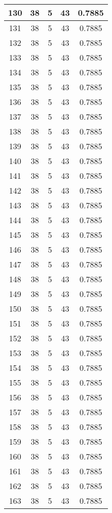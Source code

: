 \documentclass[letterpaper, 12pt]{article}
\begin{document}
\begin{longtable}{|c|c|c|c|c|}
\hline
130 & 38 & 5 & 43 & 0.7885 \\
\hline
131 & 38 & 5 & 43 & 0.7885 \\
\hline
132 & 38 & 5 & 43 & 0.7885 \\
\hline
133 & 38 & 5 & 43 & 0.7885 \\
\hline
134 & 38 & 5 & 43 & 0.7885 \\
\hline
135 & 38 & 5 & 43 & 0.7885 \\
\hline
136 & 38 & 5 & 43 & 0.7885 \\
\hline
137 & 38 & 5 & 43 & 0.7885 \\
\hline
138 & 38 & 5 & 43 & 0.7885 \\
\hline
139 & 38 & 5 & 43 & 0.7885 \\
\hline
140 & 38 & 5 & 43 & 0.7885 \\
\hline
141 & 38 & 5 & 43 & 0.7885 \\
\hline
142 & 38 & 5 & 43 & 0.7885 \\
\hline
143 & 38 & 5 & 43 & 0.7885 \\
\hline
144 & 38 & 5 & 43 & 0.7885 \\
\hline
145 & 38 & 5 & 43 & 0.7885 \\
\hline
146 & 38 & 5 & 43 & 0.7885 \\
\hline
147 & 38 & 5 & 43 & 0.7885 \\
\hline
148 & 38 & 5 & 43 & 0.7885 \\
\hline
149 & 38 & 5 & 43 & 0.7885 \\
\hline
150 & 38 & 5 & 43 & 0.7885 \\
\hline
151 & 38 & 5 & 43 & 0.7885 \\
\hline
152 & 38 & 5 & 43 & 0.7885 \\
\hline
153 & 38 & 5 & 43 & 0.7885 \\
\hline
154 & 38 & 5 & 43 & 0.7885 \\
\hline
155 & 38 & 5 & 43 & 0.7885 \\
\hline
156 & 38 & 5 & 43 & 0.7885 \\
\hline
157 & 38 & 5 & 43 & 0.7885 \\
\hline
158 & 38 & 5 & 43 & 0.7885 \\
\hline
159 & 38 & 5 & 43 & 0.7885 \\
\hline
160 & 38 & 5 & 43 & 0.7885 \\
\hline
161 & 38 & 5 & 43 & 0.7885 \\
\hline
162 & 38 & 5 & 43 & 0.7885 \\
\hline
163 & 38 & 5 & 43 & 0.7885 \\

\end{longtable}
\end{document}
